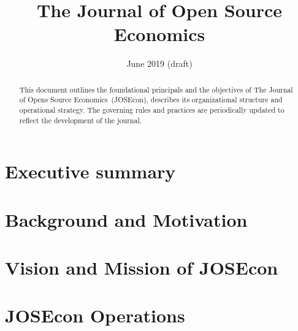 \documentclass[12pt,a4paper]{article}
\begin{document}
\title{{\Large The Journal of Open Source Economics}\\ \vspace{0.5em}{\Huge Journal Charter}}
\date{June 2019 {\small(draft)}}
\maketitle
\thispagestyle{empty}
\setcounter{page}{0}
\begin{abstract}
\noindent
This document outlines the foundational principals and the objectives of 
The Journal of Opens Source Economics~(JOSEcon),
describes its organizational structure and operational strategy.
The governing rules and practices are periodically updated to reflect 
the development of the journal.
\end{abstract}
\vspace{8ex}

\setlength{\parskip}{0em}
{\singlespacing \footnotesize \tableofcontents}
\clearpage
\setlength{\parskip}{0.5em}

\section{Executive summary}


\section{Background and Motivation}


\section{Vision and Mission of JOSEcon}


\section{JOSEcon Operations}

\end{document}
